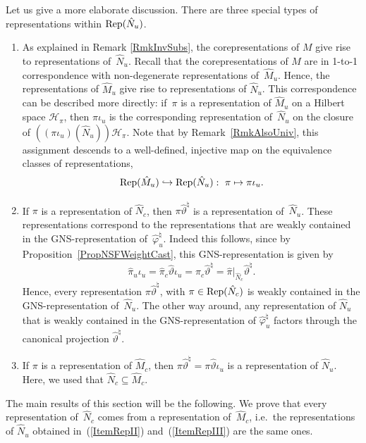 \documentclass[pdftex]{sigma}
\numberwithin{equation}{section}
\theoremstyle{definition}
\newcommand{\Rep}{\text{\rm Rep}}
\newcommand{\cHil}{\mathcal{H}}
\begin{document}
Let us give a more elaborate discussion. There are three special types of representations within $\Rep(\hat{N}_u)$.
\begin{enumerate}\itemsep=0pt
\item\label{ItemRepI} As explained in Remark \ref{RmkInvSubs}, the corepresentations of $M$ give rise to representations of~$\hat{N}_u$. Recall \cite{Kus} that the corepresentations of $M$ are in 1-to-1 correspondence with non-degenerate representations of~$\hat{M}_u$. Hence, the representations of $\hat{M}_u$ give rise to representations of $\hat{N}_u$. This correspondence can be described more directly: if~$\pi$ is a representation of $\hat{M}_u$ on a Hilbert space $\cHil_\pi$, then $\pi\iota_u$ is the corresponding representation of~$\hat{N}_u$ on the closure of $((\pi\iota_u)(\hat{N}_u)) \cHil_\pi$.  Note that by Remark~\ref{RmkAlsoUniv}, this assignment  descends to a well-def\/ined, injective map on the equivalence classes of representations,
\[
\Rep(\hat{M}_u) \hookrightarrow \Rep(\hat{N}_u): \ \pi \mapsto \pi \iota_u.
\]
\item\label{ItemRepII} If $\pi$ is a representation of $\hat{N}_c$, then $\pi \hat{\vartheta}^\natural$ is a representation of~$\hat{N}_u$. These representations correspond to the representations that are weakly contained in the GNS-representation of~$\hat{\varphi}^\natural_u$. Indeed this follows, since by Proposition~\ref{PropNSFWeightCast}, this GNS-representation is given by
\[
\hat{\pi}_u \iota_u = \hat{\pi}_c \hat{\vartheta} \iota_u = \hat{\pi}_c \hat{\vartheta}^\natural = \hat{\pi}\vert_{\hat{N}_c} \hat{\vartheta}^\natural.
\]
Hence, every representation   $\pi \hat{\vartheta}^\natural$, with $\pi \in \Rep(\hat{N}_c)$ is weakly contained in the GNS-representation of~$\hat{N}_u$. The other way around, any representation of $\hat{N}_u$ that is weakly contained in the GNS-representation of $\hat{\varphi}^\natural_u$ factors through the canonical projection $\hat{\vartheta}^\natural$.
\item\label{ItemRepIII} If $\pi$ is a representation of $\hat{M}_c$, then $\pi \hat{\vartheta}^\natural = \pi \hat{\vartheta} \iota_u$ is a representation of $\hat{N}_u$.  Here, we  used that $\hat{N}_c \subseteq \hat{M}_c$.
\end{enumerate}

The main results of this section will be the following. We prove that every representation of~$\hat{N}_c$ comes from a representation of~$\hat{M}_c$, i.e.\ the representations of $\hat{N}_u$ obtained in~(\ref{ItemRepII}) and~(\ref{ItemRepIII}) are the same ones.
\end{document}
